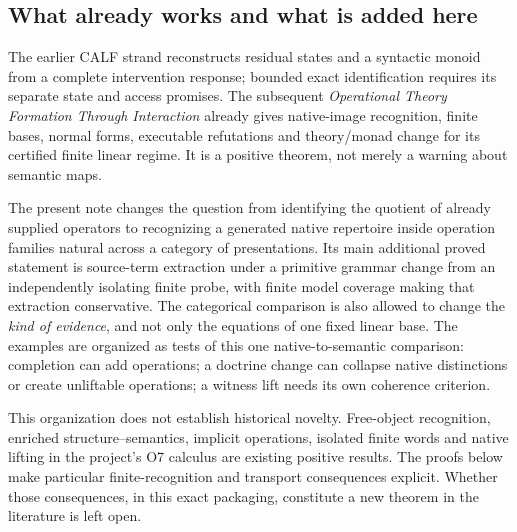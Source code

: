 \documentclass[11pt]{article}
\theoremstyle{definition}
\theoremstyle{remark}
\begin{document}
\subsection{What already works and what is added here}
The earlier CALF strand reconstructs residual states and a syntactic monoid
from a complete intervention response; bounded exact identification requires
its separate state and access promises. The subsequent
\emph{Operational Theory Formation Through Interaction} already gives
native-image recognition, finite bases, normal forms, executable refutations
and theory/monad change for its certified finite linear regime. It is a
positive theorem, not merely a warning about semantic maps.

The present note changes the question from identifying the quotient of
already supplied operators to recognizing a generated native repertoire
inside operation families natural across a category of presentations. Its
main additional proved statement is source-term extraction under a primitive
grammar change from an independently isolating finite probe, with finite
model coverage making that extraction conservative. The categorical
comparison is also allowed to change the \emph{kind of evidence}, and not
only the equations of one fixed linear base. The examples are organized as
tests of this one native-to-semantic comparison: completion can add
operations; a doctrine change can collapse native distinctions or create
unliftable operations; a witness lift needs its own coherence criterion.

This organization does not establish historical novelty. Free-object
recognition, enriched structure--semantics, implicit operations, isolated
finite words and native lifting in the project's O7 calculus are existing
positive results. The proofs below make particular finite-recognition and
transport consequences explicit. Whether those consequences, in this exact
packaging, constitute a new theorem in the literature is left open.
\end{document}
